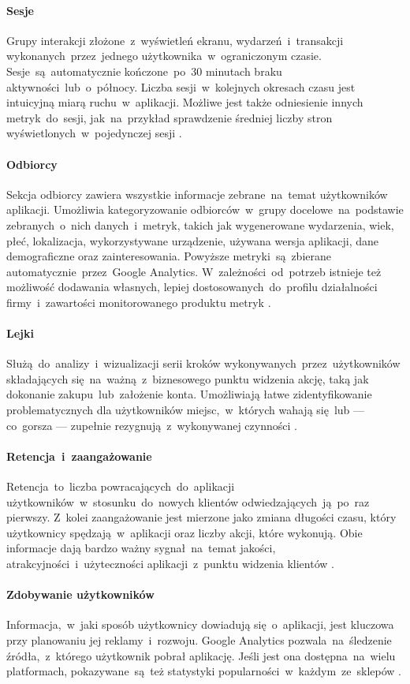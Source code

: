 \paragraph{Sesje}
Grupy interakcji złożone~z~wyświetleń ekranu, wydarzeń~i~transakcji wykonanych~przez~jednego użytkownika~w~ograniczonym czasie. Sesje~są~automatycznie kończone~po~30 minutach braku aktywności~lub~o~północy. Liczba sesji~w~kolejnych okresach czasu jest intuicyjną miarą ruchu~w~aplikacji. Możliwe jest także odniesienie innych metryk~do~sesji, jak~na~przykład sprawdzenie średniej liczby stron wyświetlonych~w~pojedynczej sesji \cite{GA_Sessions}.

\paragraph{Odbiorcy}
\label{par:ga-audiences}
Sekcja odbiorcy zawiera wszystkie informacje zebrane~na~temat użytkowników aplikacji. Umożliwia kategoryzowanie odbiorców~w~grupy docelowe~na~podstawie zebranych~o~nich danych~i~metryk, takich jak wygenerowane wydarzenia, wiek, płeć, lokalizacja, wykorzystywane urządzenie, używana wersja aplikacji, dane demograficzne oraz zainteresowania. Powyższe metryki~są~zbierane automatycznie~przez~Google Analytics. W~zależności~od~potrzeb istnieje też możliwość dodawania własnych, lepiej dostosowanych~do~profilu działalności firmy~i~zawartości monitorowanego produktu metryk \cite{GA_Audiences}.

\paragraph{Lejki}
\label{par:ga-funnels}
Służą~do~analizy~i~wizualizacji serii kroków wykonywanych~przez~użytkowników składających się~na~ważną~z~biznesowego punktu widzenia akcję, taką jak dokonanie zakupu~lub~założenie konta. Umożliwiają łatwe zidentyfikowanie problematycznych dla użytkowników miejsc,~w~których wahają się~lub --- co~gorsza --- zupełnie rezygnują~z~wykonywanej czynności \cite{GA_Funnels}.

\paragraph{Retencja~i~zaangażowanie} 
\label{par:ga-retention}
Retencja~to~liczba powracających~do~aplikacji  użytkowników~w~stosunku~do~nowych klientów odwiedzających~ją~po~raz pierwszy. Z~kolei zaangażowanie jest mierzone jako zmiana długości czasu, który użytkownicy spędzają~w~aplikacji oraz liczby akcji, które wykonują. Obie informacje dają bardzo ważny sygnał~na~temat jakości, atrakcyjności~i~użyteczności aplikacji~z~punktu widzenia klientów \cite{GA_Retention}.

\paragraph{Zdobywanie użytkowników}
Informacja,~w~jaki sposób użytkownicy dowiadują się~o~aplikacji, jest kluczowa przy planowaniu jej reklamy~i~rozwoju. Google Analytics pozwala~na~śledzenie źródła,~z~którego użytkownik pobrał aplikację. Jeśli jest ona dostępna~na~wielu platformach, pokazywane~są~też statystyki popularności~w~każdym~ze~sklepów \cite{GA_Aquisition}.
